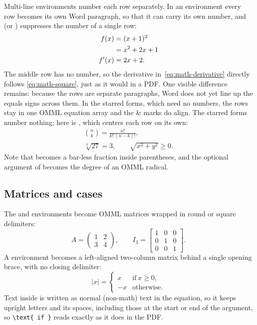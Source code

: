 Multi-line environments number each row separately. In an  environment every row
becomes its own Word paragraph, so that it can carry its own number, and  (or
) suppresses the number of a single row:
\begin{align}
  f(x) &= (x + 1)^2 \label{eq:math-square} \\
       &= x^2 + 2x + 1 \notag \\
  f'(x) &= 2x + 2. \label{eq:math-derivative}
\end{align}
The middle row has no number, so the derivative in~\eqref{eq:math-derivative} directly follows
\eqref{eq:math-square}, just as it would in a PDF. One visible difference remains: because the rows are separate paragraphs,
Word does not yet line up the equals signs across them. In the starred forms, which
need no numbers, the rows stay in one OMML equation array and the \& marks do align.
The starred forms number nothing; here is
, which centres each row on its own:
\begin{gather*}
  \binom{n}{k} = \frac{n!}{k!\,(n-k)!}, \\
  \sqrt[3]{27} = 3, \qquad \sqrt{x^2 + y^2} \geq 0.
\end{gather*}
Note that  becomes a bar-less fraction inside parentheses, and the optional argument
of  becomes the degree of an OMML radical.

\subsection{Matrices and cases}

The  and  environments become OMML matrices wrapped in round or
square delimiters:
\[
  A = \begin{pmatrix} 1 & 2 \\ 3 & 4 \end{pmatrix},
  \qquad
  I_3 = \begin{bmatrix} 1 & 0 & 0 \\ 0 & 1 & 0 \\ 0 & 0 & 1 \end{bmatrix}.
\]
A  environment becomes a left-aligned two-column matrix behind a single opening
brace, with no closing delimiter:
\begin{equation}\label{eq:math-abs}
  |x| = \begin{cases}
    x  & \text{if}\ x \geq 0, \\
    -x & \text{otherwise.}
  \end{cases}
\end{equation}
Text inside  is written as normal (non-math) text in the equation, so it keeps
upright letters and its spaces, including those at the start or end of the argument, so
\verb|\text{ if }| reads exactly as it does in the PDF.

